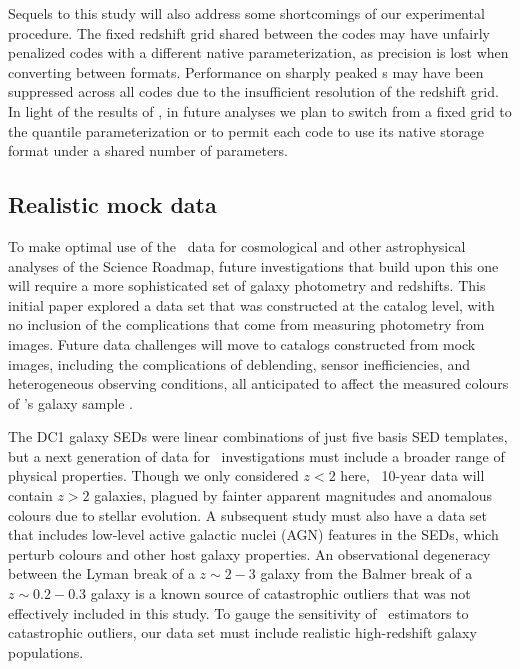 Sequels to this study will also address some shortcomings of our experimental procedure.
The fixed redshift grid shared between the codes may have unfairly penalized codes with a different native parameterization, as precision is lost when converting between formats.
Performance on sharply peaked \pzpdf s may have been suppressed across all codes due to the insufficient resolution of the redshift grid.
In light of the results of \citet[]{Malz:qp}, in future analyses we plan to switch from a fixed grid to the quantile parameterization or to permit each code to use its native storage format under a shared number of parameters.

\subsection{Realistic mock data}
\label{sec:futuredata}

To make optimal use of the \lsst\ data for cosmological and other astrophysical analyses of the Science Roadmap, future investigations that build upon this one will require a more sophisticated set of galaxy photometry and redshifts.
This initial paper explored a data set that was constructed at the catalog level, with no inclusion of the complications that come from measuring photometry from images.
Future data challenges will move to catalogs constructed from mock images, including the complications of deblending, sensor inefficiencies, and heterogeneous observing conditions, all anticipated to affect the measured colours of \lsst's galaxy sample \citep{Dawson:2016}.

The DC1 galaxy SEDs were linear combinations of just five basis SED templates, but a next generation of data for \pzpdf\ investigations must include a broader range of physical properties.
Though we only considered $z < 2$ here, \lsst\ 10-year data will contain $z > 2$ galaxies, plagued by fainter apparent magnitudes and anomalous colours due to stellar evolution.
A subsequent study must also have a data set that includes low-level active galactic nuclei (AGN) features in the SEDs, which perturb colours and other host galaxy properties.
An observational degeneracy between the Lyman break of a $z \sim 2-3$ galaxy from the Balmer break of a $z \sim 0.2-0.3$ galaxy is a known source of catastrophic outliers \citep{Massarotti:2001} that was not effectively included in this study.
To gauge the sensitivity of \pzpdf\ estimators to catastrophic outliers, our data set must include realistic high-redshift galaxy populations.

